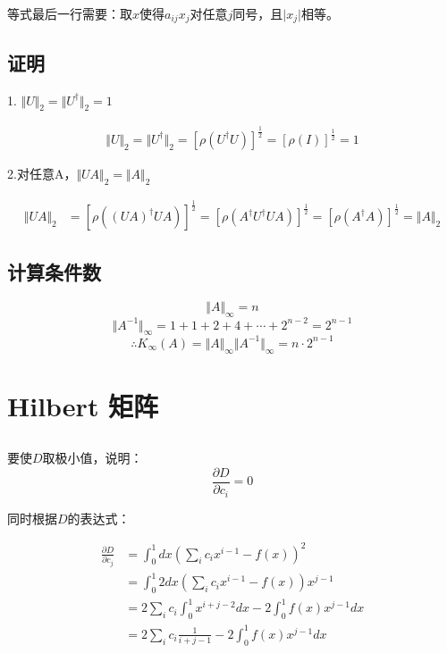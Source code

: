 \documentclass[11pt]{article}
\begin{document}
等式最后一行需要：取\(x\)使得\(a_{ij}x_{j}\)对任意\(j\)同号，且\(\vert x_j\vert\)相等。

    \subsection{证明}\label{d-ux8bc1ux660e}

1.
\(\Vert U\Vert_2=\Vert U^{\dagger}\Vert_2=1\)

\begin{equation}
\begin{aligned}
\Vert U\Vert_2=\Vert U^{\dagger}\Vert_2 = \left[\rho(U^{\dagger}U)\right]^{\frac{1}{2}}=\left[\rho(I)\right]^{\frac{1}{2}}=1
\end{aligned}
\end{equation}


2.对任意A，\(\Vert UA\Vert_2=\Vert A\Vert_2\)

\begin{equation}
\begin{aligned}
\Vert UA\Vert_2&=\left[\rho((UA)^{\dagger}UA)\right]^{\frac{1}{2}}=\left[\rho(A^{\dagger}U^{\dagger}UA)\right]^{\frac{1}{2}}=\left[\rho(A^{\dagger}A)\right]^{\frac{1}{2}}=\Vert A\Vert_2
\end{aligned}
\end{equation}


\subsection{计算条件数}

    \[
\Vert A\Vert_\infty = n
\] \[
\Vert A^{-1}\Vert_\infty=1+1+2+4+\cdots+2^{n-2}=2^{n-1}
\] \[
\therefore K_{\infty}(A)=\Vert A\Vert_\infty \Vert A^{-1}\Vert_\infty=n\cdot 2^{n-1}
\]

    \section{ Hilbert 矩阵}

\subsection{}

要使\(D\)取极小值，说明： 
\begin{equation}
\frac{\partial D}{\partial c_i}=0
\end{equation}

同时根据\(D\)的表达式： 

\begin{equation}
\begin{aligned}
\frac{\partial D}{\partial c_j}&=\int_{0}^{1} dx(\sum\limits_{i} c_i x^{i-1}-f(x))^2\\
&=\int_{0}^{1} 2dx (\sum\limits_{i} c_i x^{i-1}-f(x))x^{j-1}\\
&=2\sum\limits_{i} c_i\int_{0}^{1} x^{i+j-2} dx-2\int_{0}^{1} f(x)x^{j-1}dx\\
&=2\sum\limits_{i} c_i\frac{1}{i+j-1}-2\int_{0}^{1} f(x)x^{j-1}dx\\
\end{aligned}
\end{equation}
\end{document}

